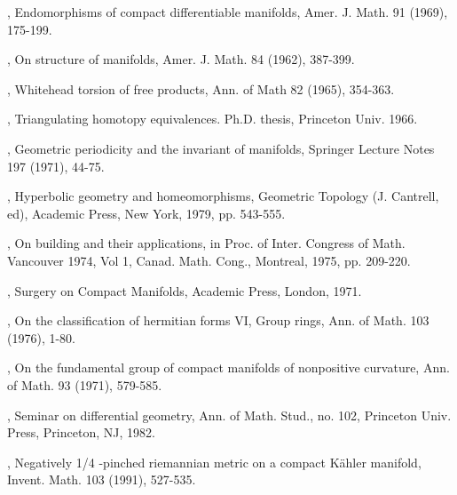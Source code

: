 \begin{thebibliography}{99}
, Endomorphisms of compact differentiable
  manifolds, Amer. J. Math. 91 (1969), 175-199.

, On structure of manifolds, Amer. J. Math. 84
  (1962), 387-399.

, Whitehead torsion of free products,
  Ann. of Math 82 (1965), 354-363.

, Triangulating homotopy
  equivalences. Ph.D. thesis, Princeton Univ. 1966.

, Geometric periodicity and the invariant of
  manifolds, Springer Lecture Notes 197 (1971), 44-75.

, Hyperbolic geometry and homeomorphisms,
  Geometric Topology (J. Cantrell, ed), Academic Press, New York,
  1979, pp. 543-555.

, On building and their applications, in Proc. of
  Inter. Congress of Math. Vancouver 1974, Vol 1, Canad. Math. Cong.,
  Montreal, 1975, pp. 209-220.

, Surgery on Compact Manifolds, Academic
  Press, London, 1971.

, On the classification of hermitian forms
  VI, Group rings, Ann. of Math. 103 (1976), 1-80. 

, On the fundamental group of compact manifolds
  of nonpositive curvature, Ann. of Math. 93 (1971), 579-585.

, Seminar on differential geometry, Ann. of
  Math. Stud., no. 102, Princeton Univ. Press, Princeton, NJ, 1982.

, Negatively 1/4 -pinched
  riemannian metric on a compact K\"ahler manifold, Invent. Math. 103
  (1991), 527-535.
\end{thebibliography}
